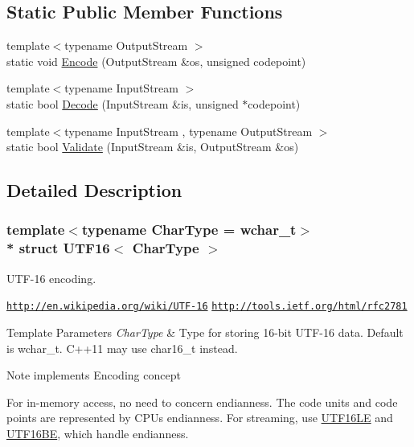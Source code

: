 \subsection*{Static Public Member Functions}
\begin{DoxyCompactItemize}
\item 
{\footnotesize template$<$typename Output\+Stream $>$ }\\static void \hyperlink{structUTF16_a9d8ded01244e30d037c4afa10ee2b30e}{Encode} (Output\+Stream \&os, unsigned codepoint)
\item 
{\footnotesize template$<$typename Input\+Stream $>$ }\\static bool \hyperlink{structUTF16_a124c79dfd9f9b4c3fb65bd55ba17b4be}{Decode} (Input\+Stream \&is, unsigned $\ast$codepoint)
\item 
{\footnotesize template$<$typename Input\+Stream , typename Output\+Stream $>$ }\\static bool \hyperlink{structUTF16_a7516184ed5dce10c0e7895bec124d97d}{Validate} (Input\+Stream \&is, Output\+Stream \&os)
\end{DoxyCompactItemize}


\subsection{Detailed Description}
\subsubsection*{template$<$typename Char\+Type = wchar\+\_\+t$>$\\*
struct U\+T\+F16$<$ Char\+Type $>$}

U\+T\+F-\/16 encoding. 

\href{http://en.wikipedia.org/wiki/UTF-16}{\tt http\+://en.\+wikipedia.\+org/wiki/\+U\+T\+F-\/16} \href{http://tools.ietf.org/html/rfc2781}{\tt http\+://tools.\+ietf.\+org/html/rfc2781} 
\begin{DoxyTemplParams}{Template Parameters}
{\em Char\+Type} & Type for storing 16-\/bit U\+T\+F-\/16 data. Default is wchar\+\_\+t. C++11 may use char16\+\_\+t instead. \\
\hline
\end{DoxyTemplParams}
\begin{DoxyNote}{Note}
implements Encoding concept

For in-\/memory access, no need to concern endianness. The code units and code points are represented by C\+PU\textquotesingle{}s endianness. For streaming, use \hyperlink{structUTF16LE}{U\+T\+F16\+LE} and \hyperlink{structUTF16BE}{U\+T\+F16\+BE}, which handle endianness. 
\end{DoxyNote}


